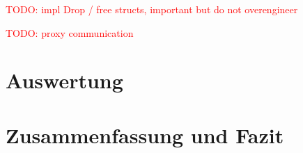 \documentclass[
	12pt,
	table,
	bigheadings,
	ngerman,
	a4paper,
	BCOR5mm,
	DIV14,
	1.1headlines,
	pagesize,
	oneside,
	openright,
	titlepage,
	headsepline,
	nochapterprefix,
	bibtotoc,
	tocindent,
	listsindent,
	pointlessnumbers,
	cleardoubleempty,
	fleqn,
	halfparskip
]{scrbook}
\newcommand{\todo}[1]{\textcolor{red}{TODO: #1}}
\begin{document}
		\todo{impl Drop / free structs, important but do not overengineer}
		
		\todo{proxy communication}
			
			
	\chapter{Auswertung}
	
	\chapter{Zusammenfassung und Fazit}
	
	
	
	
	\clearpage
	\normalem
	\printbibliography
	
	\clearpage
	\printglossary[type=\acronymtype]

	\clearpage
	\listoffigures
	\lstlistoflistings
	
	
\end{document}
